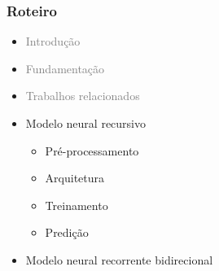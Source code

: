 \documentclass[10pt]{beamer}
\begin{document}
\begin{frame}
  \frametitle{Roteiro}


  \begin{itemize}


    
    \item[\color{gray}{$\bullet$}] \textcolor{gray}{Introdução}
    
    
    \item[\color{gray}{$\bullet$}] \textcolor{gray}{Fundamentação}


    
    \item[\color{gray}{$\bullet$}] \textcolor{gray}{Trabalhos relacionados}

    
    \item Modelo neural recursivo
    \begin{itemize}
      \item[\ ] Pré-processamento
      \item[\ ] Arquitetura
      \item[\ ] Treinamento
      \item[\ ] Predição
    \end{itemize}

    \color{gray}
    \item[\color{gray}{$\bullet$}] Modelo neural recorrente bidirecional


\end{itemize}
\end{frame}
\end{document}
